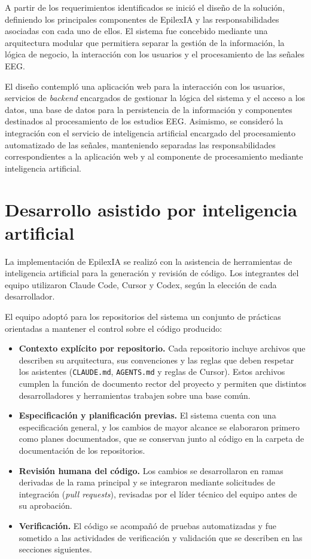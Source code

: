 A partir de los requerimientos identificados se inició el diseño de la solución,
definiendo los principales componentes de EpilexIA y las responsabilidades
asociadas con cada uno de ellos. El sistema fue concebido mediante una
arquitectura modular que permitiera separar la gestión de la información, la
lógica de negocio, la interacción con los usuarios y el procesamiento de las
señales EEG.

El diseño contempló una aplicación web para la interacción con los usuarios,
servicios de \textit{backend} encargados de gestionar la lógica del sistema y el acceso
a los datos, una base de datos para la persistencia de la información y
componentes destinados al procesamiento de los estudios EEG. Asimismo, se
consideró la integración con el servicio de inteligencia artificial encargado
del procesamiento automatizado de las señales, manteniendo separadas las
responsabilidades correspondientes a la aplicación web y al componente de
procesamiento mediante inteligencia artificial.

\section{Desarrollo asistido por inteligencia artificial}
\label{sec:desarrollo-asistido-ia}

La implementación de EpilexIA se realizó con la asistencia de herramientas de inteligencia artificial para la generación y revisión de código.
Los integrantes del equipo utilizaron Claude Code, Cursor y Codex, según la elección de cada desarrollador.

El equipo adoptó para los repositorios del sistema un conjunto de prácticas orientadas a mantener el control sobre el código producido:

\begin{itemize}
    \item \textbf{Contexto explícito por repositorio.}
    Cada repositorio incluye archivos que describen su arquitectura, sus convenciones y las reglas que deben respetar los asistentes (\texttt{CLAUDE.md}, \texttt{AGENTS.md} y reglas de Cursor).
    Estos archivos cumplen la función de documento rector del proyecto y permiten que distintos desarrolladores y herramientas trabajen sobre una base común.

    \item \textbf{Especificación y planificación previas.}
    El sistema cuenta con una especificación general, y los cambios de mayor alcance se elaboraron primero como planes documentados, que se conservan junto al código en la carpeta de documentación de los repositorios.

    \item \textbf{Revisión humana del código.}
    Los cambios se desarrollaron en ramas derivadas de la rama principal y se integraron mediante solicitudes de integración (\textit{pull requests}), revisadas por el líder técnico del equipo antes de su aprobación.

    \item \textbf{Verificación.}
    El código se acompañó de pruebas automatizadas y fue sometido a las actividades de verificación y validación que se describen en las secciones siguientes.
\end{itemize}

